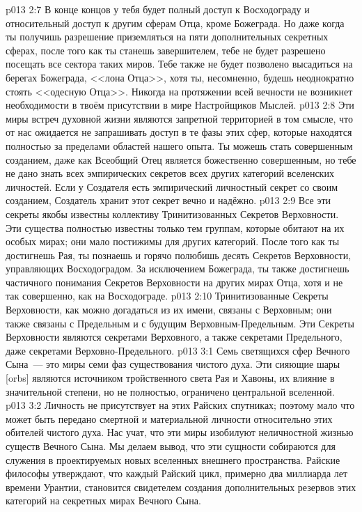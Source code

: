 \vs p013 2:7 В конце концов у тебя будет полный доступ к Восходограду и относительный доступ к другим сферам Отца, кроме Божеграда. Но даже когда ты получишь разрешение приземляться на пяти дополнительных секретных сферах, после того как ты станешь завершителем, тебе не будет разрешено посещать все сектора таких миров. Тебе также не будет позволено высадиться на берегах Божеграда, <<лона Отца>>, хотя ты, несомненно, будешь неоднократно стоять <<одесную Отца>>. Никогда на протяжении всей вечности не возникнет необходимости в твоём присутствии в мире Настройщиков Мыслей.
\vs p013 2:8 Эти миры встреч духовной жизни являются запретной территорией в том смысле, что от нас ожидается не запрашивать доступ в те фазы этих сфер, которые находятся полностью за пределами областей нашего опыта. Ты можешь стать совершенным созданием, даже как Всеобщий Отец является божественно совершенным, но тебе не дано знать всех эмпирических секретов всех других категорий вселенских личностей. Если у Создателя есть эмпирический личностный секрет со своим созданием, Создатель хранит этот секрет вечно и надёжно.
\vs p013 2:9 \pc Все эти секреты якобы известны коллективу Тринитизованных Секретов Верховности. Эти существа полностью известны только тем группам, которые обитают на их особых мирах; они мало постижимы для других категорий. После того как ты достигнешь Рая, ты познаешь и горячо полюбишь десять Секретов Верховности, управляющих Восходоградом. За исключением Божеграда, ты также достигнешь частичного понимания Секретов Верховности на других мирах Отца, хотя и не так совершенно, как на Восходограде.
\vs p013 2:10 Тринитизованные Секреты Верховности, как можно догадаться из их имени, связаны с Верховным; они также связаны с Предельным и с будущим Верховным\hyp{}Предельным. Эти Секреты Верховности являются секретами Верховного, а также секретами Предельного, даже секретами Верховно\hyp{}Предельного.
\vs p013 3:1 Семь светящихся сфер Вечного Сына~--- это миры семи фаз существования чистого духа. Эти сияющие шары [orbs] являются источником тройственного света Рая и Хавоны, их влияние в значительной степени, но не полностью, ограничено центральной вселенной.
\vs p013 3:2 Личность не присутствует на этих Райских спутниках; поэтому мало что может быть передано смертной и материальной личности относительно этих обителей чистого духа. Нас учат, что эти миры изобилуют неличностной жизнью существ Вечного Сына. Мы делаем вывод, что эти сущности собираются для служения в проектируемых новых вселенных внешнего пространства. Райские философы утверждают, что каждый Райский цикл, примерно два миллиарда лет времени Урантии, становится свидетелем создания дополнительных резервов этих категорий на секретных мирах Вечного Сына.
